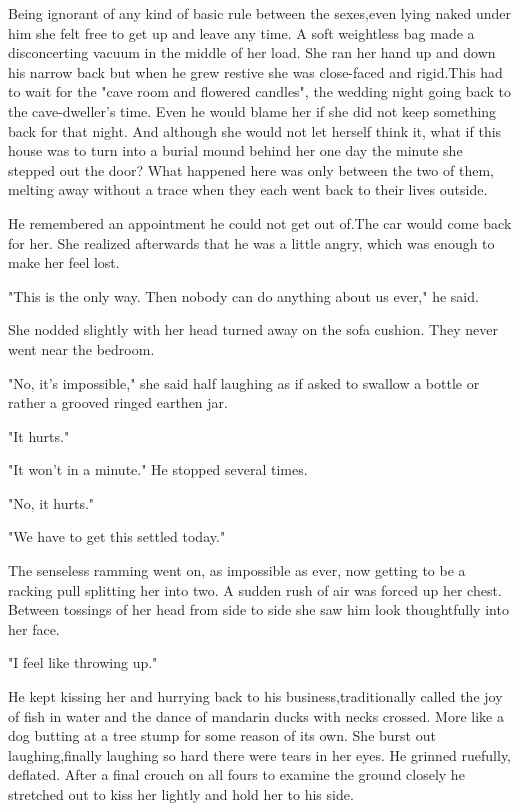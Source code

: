 \par Being ignorant of any kind of basic rule between the sexes,even lying naked under him she felt free to get up and leave any time. A soft weightless bag made a disconcerting vacuum in the middle of her load. She ran her hand up and down his narrow back but when he grew restive she was close-faced and rigid.This had to wait for the "cave room and flowered candles", the wedding night going back to the cave-dweller's time. Even he would blame her if she did not keep something back for that night. And although she would not let herself think it, what if this house was to turn into a burial mound behind her one day the minute she stepped out the door? What happened here was only between the two of them, melting away without a trace when they each went back to their lives outside.
\par He remembered an appointment he could not get out of.The car would come back for her. She realized afterwards that he was a little angry, which was enough to make her feel lost.
\par "This is the only way. Then nobody can do anything about us ever," he said.
\par She nodded slightly with her head turned away on the sofa cushion. They never went near the bedroom.
\par "No, it's impossible," she said half laughing as if asked to swallow a bottle or rather a grooved ringed earthen jar.
\par "It hurts."
\par "It won't in a minute." He stopped several times.
\par "No, it hurts."
\par "We have to get this settled today."
\par The senseless ramming went on, as impossible as ever, now getting to be a racking pull splitting her into two. A sudden rush of air was forced up her chest. Between tossings of her head from side to side she saw him look thoughtfully into her face.
\par "I feel like throwing up."
\par He kept kissing her and hurrying back to his business,traditionally called the joy of fish in water and the dance of mandarin ducks with necks crossed. More like a dog butting at a tree stump for some reason of its own. She burst out laughing,finally laughing so hard there were tears in her eyes. He grinned ruefully, deflated. After a final crouch on all fours to examine the ground closely he stretched out to kiss her lightly and hold her to his side.
